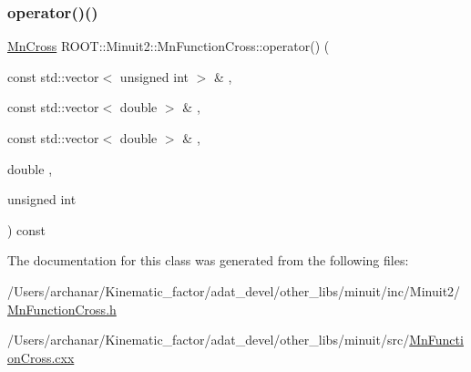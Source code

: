 \subsubsection{\texorpdfstring{operator()()}{operator()()}\hspace{0.1cm}{\footnotesize\ttfamily [2/2]}}
{\footnotesize\ttfamily \mbox{\hyperlink{classROOT_1_1Minuit2_1_1MnCross}{Mn\+Cross}} R\+O\+O\+T\+::\+Minuit2\+::\+Mn\+Function\+Cross\+::operator() (\begin{DoxyParamCaption}\item[{const std\+::vector$<$ unsigned int $>$ \&}]{,  }\item[{const std\+::vector$<$ double $>$ \&}]{,  }\item[{const std\+::vector$<$ double $>$ \&}]{,  }\item[{double}]{,  }\item[{unsigned int}]{ }\end{DoxyParamCaption}) const}



The documentation for this class was generated from the following files\+:\begin{DoxyCompactItemize}
\item 
/\+Users/archanar/\+Kinematic\+\_\+factor/adat\+\_\+devel/other\+\_\+libs/minuit/inc/\+Minuit2/\mbox{\hyperlink{other__libs_2minuit_2inc_2Minuit2_2MnFunctionCross_8h}{Mn\+Function\+Cross.\+h}}\item 
/\+Users/archanar/\+Kinematic\+\_\+factor/adat\+\_\+devel/other\+\_\+libs/minuit/src/\mbox{\hyperlink{MnFunctionCross_8cxx}{Mn\+Function\+Cross.\+cxx}}\end{DoxyCompactItemize}
